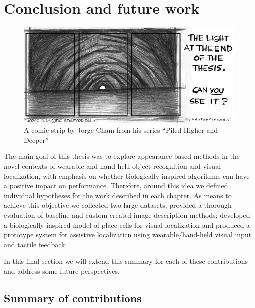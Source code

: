 \chapter{Conclusion and future work}\label{ch:conclusion}

\begin{figure}[h!]
\centering
\includegraphics[width=.8\textwidth]{./gfx/Chapter07/phd051700s.jpg}
\caption{A  comic strip by Jorge Cham from his series ``Piled Higher and Deeper'' \cite{Cham}}
\end{figure}

The main goal of this thesis was to explore appearance-based methods in the novel contexts of wearable and hand-held object recognition and visual localization, with emphasis on whether biologically-inspired algorithms can have a positive impact on performance. Therefore, around this idea we defined individual hypotheses for the work described in each chapter. As means to achieve this objective we collected two large datasets; provided a thorough evaluation of baseline and custom-created image description methods; developed a biologically inspired model of place cells for visual localization and produced a prototype system for assistive localization using wearable/hand-held visual input and tactile feedback.

In this final section we will extend this summary for each of these contributions and address some future perspectives.

\section{Summary of contributions}

